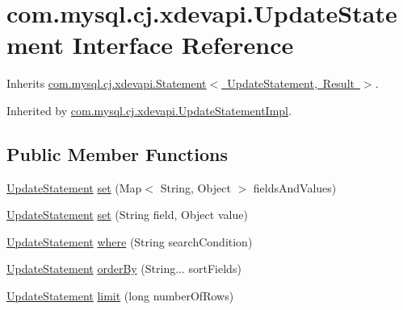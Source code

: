 \hypertarget{interfacecom_1_1mysql_1_1cj_1_1xdevapi_1_1_update_statement}{}\section{com.\+mysql.\+cj.\+xdevapi.\+Update\+Statement Interface Reference}
\label{interfacecom_1_1mysql_1_1cj_1_1xdevapi_1_1_update_statement}


Inherits \mbox{\hyperlink{interfacecom_1_1mysql_1_1cj_1_1xdevapi_1_1_statement}{com.\+mysql.\+cj.\+xdevapi.\+Statement$<$ Update\+Statement, Result $>$}}.



Inherited by \mbox{\hyperlink{classcom_1_1mysql_1_1cj_1_1xdevapi_1_1_update_statement_impl}{com.\+mysql.\+cj.\+xdevapi.\+Update\+Statement\+Impl}}.

\subsection*{Public Member Functions}
\begin{DoxyCompactItemize}
\item 
\mbox{\hyperlink{interfacecom_1_1mysql_1_1cj_1_1xdevapi_1_1_update_statement}{Update\+Statement}} \mbox{\hyperlink{interfacecom_1_1mysql_1_1cj_1_1xdevapi_1_1_update_statement_a55ee82b73b4faf50fa2ba7dbbd723819}{set}} (Map$<$ String, Object $>$ fields\+And\+Values)
\item 
\mbox{\hyperlink{interfacecom_1_1mysql_1_1cj_1_1xdevapi_1_1_update_statement}{Update\+Statement}} \mbox{\hyperlink{interfacecom_1_1mysql_1_1cj_1_1xdevapi_1_1_update_statement_a01e50a32f4bf89c98b112b7e22a6f140}{set}} (String field, Object value)
\item 
\mbox{\hyperlink{interfacecom_1_1mysql_1_1cj_1_1xdevapi_1_1_update_statement}{Update\+Statement}} \mbox{\hyperlink{interfacecom_1_1mysql_1_1cj_1_1xdevapi_1_1_update_statement_a930a2d5be11f037550eef14968313206}{where}} (String search\+Condition)
\item 
\mbox{\hyperlink{interfacecom_1_1mysql_1_1cj_1_1xdevapi_1_1_update_statement}{Update\+Statement}} \mbox{\hyperlink{interfacecom_1_1mysql_1_1cj_1_1xdevapi_1_1_update_statement_abc8c16c23cdf1c91f25150510daa50fd}{order\+By}} (String... sort\+Fields)
\item 
\mbox{\hyperlink{interfacecom_1_1mysql_1_1cj_1_1xdevapi_1_1_update_statement}{Update\+Statement}} \mbox{\hyperlink{interfacecom_1_1mysql_1_1cj_1_1xdevapi_1_1_update_statement_aa0c63fa683850b7140811b5d52de3fe9}{limit}} (long number\+Of\+Rows)
\end{DoxyCompactItemize}


